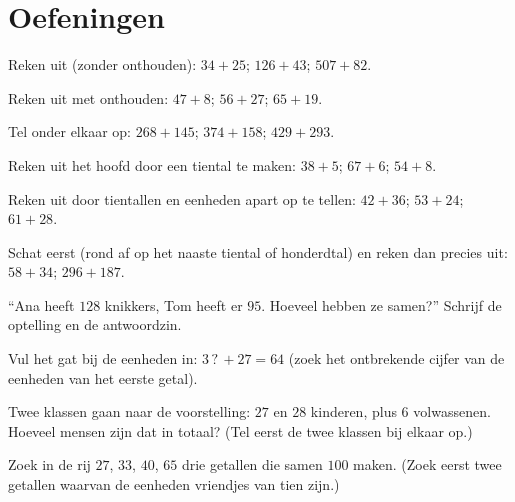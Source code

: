 \section{Oefeningen}

\begin{exercise}[$\star$]\label{exo:g2:addition:1}
Reken uit (zonder onthouden): $34 + 25$; \quad $126 + 43$; \quad
$507 + 82$.
\end{exercise}

\begin{exercise}[$\star$]\label{exo:g2:addition:2}
Reken uit met onthouden: $47 + 8$; \quad $56 + 27$; \quad $65 + 19$.
\end{exercise}

\begin{exercise}[$\star$]\label{exo:g2:addition:3}
Tel onder elkaar op: $268 + 145$; \quad $374 + 158$; \quad
$429 + 293$.
\end{exercise}

\begin{exercise}[$\star$]\label{exo:g2:addition:4}
Reken uit het hoofd door een tiental te maken: $38 + 5$; \quad
$67 + 6$; \quad $54 + 8$.
\end{exercise}

\begin{exercise}[$\star$]\label{exo:g2:addition:5}
Reken uit door tientallen en eenheden apart op te tellen: $42 + 36$;
\quad $53 + 24$; \quad $61 + 28$.
\end{exercise}

\begin{exercise}[$\star$]\label{exo:g2:addition:6}
Schat eerst (rond af op het naaste tiental of honderdtal) en reken dan
precies uit: $58 + 34$; \quad $296 + 187$.
\end{exercise}

\begin{exercise}[$\star$]\label{exo:g2:addition:7}
``Ana heeft $128$ knikkers, Tom heeft er $95$. Hoeveel hebben ze
samen?'' Schrijf de optelling en de antwoordzin.
\end{exercise}

\begin{exercise}[$\star$]\label{exo:g2:addition:8}
Vul het gat bij de eenheden in: $3\,?\, + 27 = 64$ (zoek het
ontbrekende cijfer van de eenheden van het eerste getal).
\end{exercise}

\begin{exercise}[$\star$]\label{exo:g2:addition:9}
Twee klassen gaan naar de voorstelling: $27$ en $28$ kinderen, plus $6$
volwassenen. Hoeveel mensen zijn dat in totaal? (Tel eerst de twee
klassen bij elkaar op.)
\end{exercise}

\begin{exercise}[$\star\star$]\label{exo:g2:addition:10}
Zoek in de rij $27$, $33$, $40$, $65$ drie getallen die samen $100$
maken. (Zoek eerst twee getallen waarvan de eenheden vriendjes van tien
zijn.)
\end{exercise}
